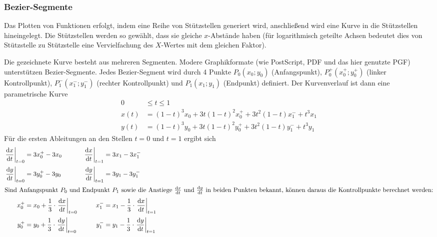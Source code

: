 \documentclass[ngerman,origlongtable]{scrartcl}
\begin{document}
\subsubsection{Bezier-Segmente}
Das Plotten von Funktionen erfolgt, indem eine Reihe von Stützstellen
generiert wird, anschließend wird eine Kurve in die Stützstellen hineingelegt.
Die Stützstellen werden so gewählt, dass sie gleiche \(x\)-Abstände
haben (für logarithmisch geteilte Achsen bedeutet dies von Stützstelle
zu Stützstelle eine Vervielfachung des \(X\)-Wertes mit dem gleichen
Faktor).

Die gezeichnete Kurve besteht aus mehreren Segmenten. Modere Graphikformate
(wie PostScript, PDF und das hier genutzte PGF) unterstützen
Bezier-Segmente. Jedes Bezier-Segment wird durch 4 Punkte
\(P_0(x_0;y_0)\) (Anfangspunkt), \(P_0^+(x_0^+;y_0^+)\) (linker Kontrollpunkt),
\(P_1^-(x_1^-;y_1^-)\) (rechter Kontrollpunkt) und
\(P_1(x_1;y_1)\) (Endpunkt) definiert.
Der Kurvenverlauf ist dann eine parametrische
Kurve
\begin{align*}
0&\leq{}t\leq 1\\[0.2em]
x(t)&={(1-t)}^3x_0+3t{(1-t)}^2x_0^++3t^2(1-t)x_1^-+t^3x_1\\[0.2em]
y(t)&={(1-t)}^3y_0+3t{(1-t)}^2y_0^++3t^2(1-t)y_1^-+t^3y_1
\end{align*}
Für die ersten Ableitungen an den Stellen \(t=0\) und \(t=1\) ergibt sich
\begin{align*}
{\left.\frac{\mathrm{d}x}{\mathrm{d}t}\right|}_{t=0}&=3x_0^+-3x_0&{\left.\frac{\mathrm{d} x}{\mathrm{d} t}\right|}_{t=1}&=3x_1-3x_1^-\\[0.2em]
{\left.\frac{\mathrm{d}y}{\mathrm{d}t}\right|}_{t=0}&=3y_0^+-3y_0&{\left.\frac{\mathrm{d} y}{\mathrm{d} t}\right|}_{t=1}&=3y_1-3y_1^-\\
\intertext{Sind Anfangspunkt \(P_0\) und Endpunkt \(P_1\) sowie die Anstiege \(\tfrac{\mathrm{d}x}{\mathrm{d}t}\) und \(\tfrac{\mathrm{d}y}{\mathrm{d}t}\) in beiden Punkten bekannt, können daraus die Kontrollpunkte berechnet werden:}
x_0^+&=x_0+\frac{1}{3}\cdot{\left.\frac{\mathrm{d}x}{\mathrm{d}t}\right|}_{t=0}&x_1^-&=x_1-\frac{1}{3}\cdot{\left.\frac{\mathrm{d}x}{\mathrm{d}t}\right|}_{t=1}\\[0.2em]
y_0^+&=y_0+\frac{1}{3}\cdot{\left.\frac{\mathrm{d}y}{\mathrm{d}t}\right|}_{t=0}&y_1^-&=y_1-\frac{1}{3}\cdot{\left.\frac{\mathrm{d}y}{\mathrm{d}t}\right|}_{t=1}
\end{align*}
\clearpage
\end{document}
